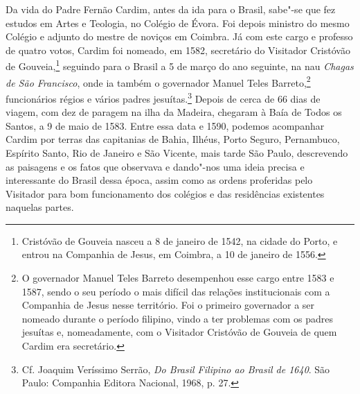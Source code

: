  Da vida do Padre Fernão Cardim, antes da ida para o Brasil, sabe"-se
que fez estudos em Artes e Teologia, no Colégio de Évora. Foi depois
ministro do mesmo Colégio e adjunto do mestre de noviços em Coimbra. Já
com este cargo e professo de quatro votos, Cardim foi nomeado, em 1582,
secretário do Visitador Cristóvão de Gouveia,\footnote{ Cristóvão
de Gouveia nasceu a 8 de janeiro de 1542, na cidade do Porto, e entrou
na Companhia de Jesus, em Coimbra, a 10 de janeiro de 1556.} 
seguindo para o Brasil a 5 de março do ano seguinte, na nau
\textit{Chagas de São Francisco}, onde ia também o governador Manuel
Teles Barreto,\footnote{ O governador Manuel Teles Barreto
desempenhou esse cargo entre 1583 e 1587, sendo o seu período o mais
difícil das relações institucionais com a Companhia de Jesus nesse
território. Foi o primeiro governador a ser nomeado durante o período
filipino, vindo a ter problemas com os padres jesuítas e, nomeadamente,
com o Visitador Cristóvão de Gouveia de quem Cardim era secretário.} 
funcionários régios e vários padres jesuítas.\footnote{ Cf.
Joaquim Veríssimo Serrão, \textit{Do Brasil Filipino ao Brasil de 1640}. 
São Paulo: Companhia Editora Nacional, 1968, p. 27.} Depois de cerca
de 66 dias de viagem, com dez de paragem na ilha da
Madeira, chegaram à Baía de Todos os Santos, a 9 de maio de 1583. Entre
essa data e 1590, podemos acompanhar Cardim por terras das capitanias
de Bahia, Ilhéus, Porto Seguro, Pernambuco, Espírito Santo, Rio de
Janeiro e São Vicente, mais tarde São Paulo, descrevendo as paisagens e
os fatos que observava e dando"-nos uma ideia precisa e interessante do
Brasil dessa época, assim como as ordens proferidas pelo Visitador para
bom funcionamento dos colégios e das residências existentes naquelas partes.

